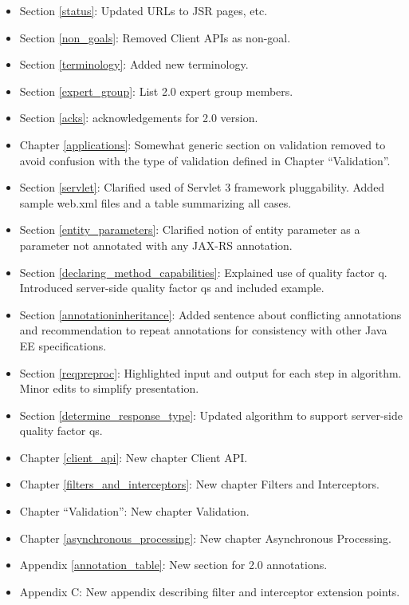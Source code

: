 \begin{itemize}
\item Section \ref{status}: Updated URLs to JSR pages, etc.
\item Section \ref{non_goals}: Removed Client APIs as non-goal.
\item Section \ref{terminology}: Added new terminology.
\item Section \ref{expert_group}: List 2.0 expert group members.
\item Section \ref{acks}: acknowledgements for 2.0 version.
\item Chapter \ref{applications}: Somewhat generic section on validation removed to avoid confusion with the type of validation defined in Chapter ``Validation''.
\item Section \ref{servlet}: Clarified used of Servlet 3 framework pluggability. Added sample web.xml files and a table summarizing all cases.
\item Section \ref{entity_parameters}: Clarified notion of entity parameter as a parameter not annotated with any JAX-RS annotation.
\item Section \ref{declaring_method_capabilities}: Explained use of quality factor q. Introduced server-side quality factor qs and included example.
\item Section \ref{annotationinheritance}: Added sentence about conflicting annotations and recommendation to repeat annotations for consistency with other Java EE specifications.
\item Section \ref{reqpreproc}: Highlighted input and output for each step in algorithm. Minor edits to simplify presentation.
\item Section \ref{determine_response_type}: Updated algorithm to support server-side quality factor qs.
\item Chapter \ref{client_api}: New chapter Client API.
\item Chapter \ref{filters_and_interceptors}: New chapter Filters and Interceptors.
\item Chapter ``Validation'': New chapter Validation.
\item Chapter \ref{asynchronous_processing}: New chapter Asynchronous Processing.
\item Appendix \ref{annotation_table}: New section for 2.0 annotations.
\item Appendix C: New appendix describing filter and interceptor extension points.
\end{itemize}

